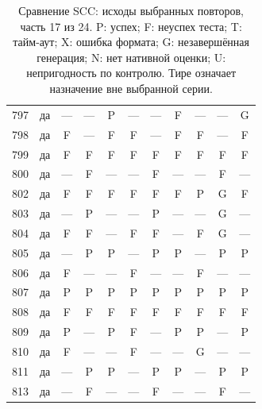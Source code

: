 \begin{table}[p]
\begin{tabular*}{\textwidth}{@{\extracolsep{\fill}}rc*{9}{c}@{}}
797 & да & — & — & P & — & — & F & — & — & G\\
798 & да & F & — & F & F & — & F & F & — & F\\
799 & да & F & F & F & F & F & F & F & F & F\\
800 & да & — & F & — & — & F & — & — & F & —\\
802 & да & F & F & F & F & F & F & P & G & F\\
803 & да & — & P & — & — & P & — & — & G & —\\
804 & да & F & F & — & F & F & — & F & G & —\\
805 & да & — & P & P & — & P & P & — & P & P\\
806 & да & F & — & — & F & — & — & F & — & —\\
807 & да & P & P & P & P & P & P & P & P & P\\
808 & да & F & F & F & F & F & F & F & F & F\\
809 & да & P & — & P & F & — & P & P & — & P\\
810 & да & F & — & — & F & — & — & G & — & —\\
811 & да & — & P & P & — & P & P & — & P & P\\
813 & да & — & F & — & — & F & — & — & F & —\\
\bottomrule\end{tabular*}
\caption{Сравнение SCC: исходы выбранных повторов, часть 17 из 24. P: успех; F: неуспех теста; T: тайм-аут; X: ошибка формата; G: незавершённая генерация; N: нет нативной оценки; U: непригодность по контролю. Тире означает назначение вне выбранной серии.}
\end{table}
\clearpage
